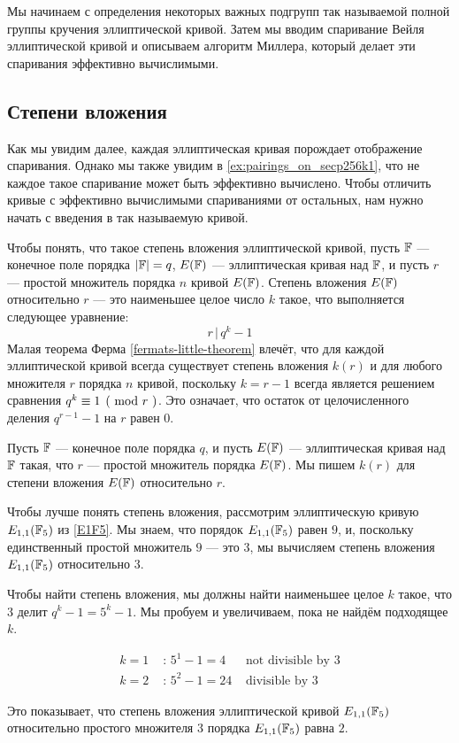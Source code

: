 Мы начинаем с определения некоторых важных подгрупп так называемой полной группы кручения эллиптической кривой. Затем мы вводим спаривание Вейля эллиптической кривой и описываем алгоритм Миллера, который делает эти спаривания эффективно вычислимыми.

\subsection{Степени вложения} Как мы увидим далее, каждая эллиптическая кривая порождает отображение спаривания. Однако мы также увидим в \examplename{} \ref{ex:pairings_on_secp256k1}, что не каждое такое спаривание может быть эффективно вычислено. Чтобы отличить кривые с эффективно вычислимыми спариваниями от остальных, нам нужно начать с введения в так называемую  кривой. 

Чтобы понять, что такое степень вложения эллиптической кривой, пусть $\mathbb{F}$ — конечное поле порядка $|\mathbb{F}|=q$, $E(\mathbb{F})$ — эллиптическая кривая над $\mathbb{F}$, и пусть $r$ — простой множитель порядка $n$ кривой $E(\mathbb{F})$. Степень вложения $E(\mathbb{F})$ относительно $r$ — это наименьшее целое число $k$ такое, что выполняется следующее уравнение:
\begin{equation}
\label{def:embedding-degree}
r\,|\, q^k-1
\end{equation}
Малая теорема Ферма \eqref{fermats-little-theorem} влечёт, что для каждой эллиптической кривой всегда существует степень вложения $k(r)$ и для любого множителя $r$ порядка $n$ кривой, поскольку $k=r-1$ всегда является решением сравнения $\kongru{q^{k}}{1}{r}$. Это означает, что остаток от целочисленного деления $q^{r-1}-1$ на $r$ равен $0$.

\begin{notation} Пусть $\mathbb{F}$ — конечное поле порядка $q$, и пусть $E(\mathbb{F})$ — эллиптическая кривая над $\mathbb{F}$ такая, что $r$ — простой множитель порядка $E(\mathbb{F})$. Мы пишем $k(r)$ для степени вложения $E(\mathbb{F})$ относительно $r$.
\end{notation}

\begin{example} Чтобы лучше понять степень вложения, рассмотрим эллиптическую кривую $E_{1,1}(\mathbb{F}_5)$ из \examplename{} \ref{E1F5}. Мы знаем, что порядок $E_{1,1}(\mathbb{F}_5)$ равен $9$, и, поскольку единственный простой множитель $9$ — это $3$, мы вычисляем степень вложения $E_{1,1}(\mathbb{F}_5)$ относительно $3$. 

Чтобы найти степень вложения, мы должны найти наименьшее целое $k$ такое, что $3$ делит $q^k-1= 5^k-1$. Мы пробуем и увеличиваем, пока не найдём подходящее $k$. 

\begin{align*}
k=1 &\text{ : } 5^1-1 = 4 & \text{ not divisible by } 3\\ 
k=2 &\text{ : } 5^2-1 = 24 & \text{ divisible by } 3
\end{align*} 

Это показывает, что степень вложения эллиптической кривой $E_{1,1}(\mathbb{F}_5)$ относительно простого множителя $3$ порядка $E_{1,1}(\mathbb{F}_5)$ равна $2$.
\end{example}

